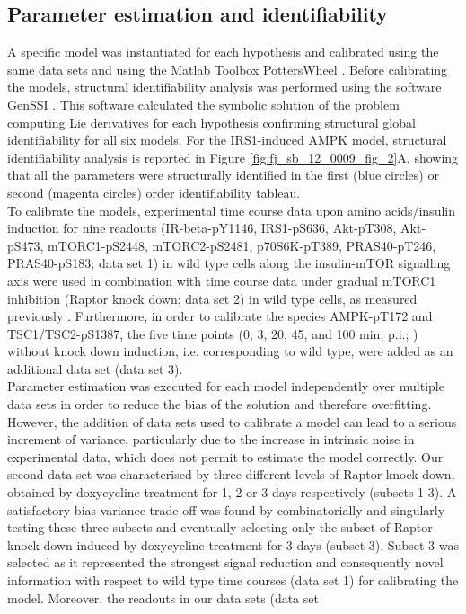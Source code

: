 \subsection{Parameter estimation and identifiability}
\label{paper2-subsec:Parameter estimation and identifiability}
A specific model was instantiated for each hypothesis and calibrated using the same data sets and using the Matlab Toolbox PottersWheel \citep{Maiwald2008}. Before calibrating the models, structural identifiability analysis was performed using the software GenSSI \citep{Chis2011}. This software calculated the symbolic solution of the problem computing Lie derivatives for each hypothesis confirming structural global identifiability for all six models.  For the IRS1-induced AMPK model, structural identifiability analysis is reported in Figure \ref{fig:fj_sb_12_0009_fig_2}A, showing that all the parameters were structurally identified in the first (blue circles) or second (magenta circles) order identifiability tableau.\\
To calibrate the models, experimental time course data upon amino acids/insulin induction for nine readouts (IR-beta-pY1146, IRS1-pS636, Akt-pT308, Akt-pS473, mTORC1-pS2448, mTORC2-pS2481, p70S6K-pT389, PRAS40-pT246, PRAS40-pS183; data set 1) in wild type cells along the insulin-mTOR signalling axis were used in combination with time course data under gradual mTORC1 inhibition (Raptor knock down; data set 2) in wild type cells, as measured previously \citep{DallePezze2012a}. Furthermore, in order to calibrate the species AMPK-pT172 and TSC1/TSC2-pS1387, the five  time points (0, 3, 20, 45, and 100 min. p.i.; \citep[Fig. 1A]{Sonntag2012}) without knock down induction, i.e. corresponding to wild type, were added as an additional data set (data set 3). \\
Parameter estimation was executed for each model independently over multiple data sets in order to reduce the bias of the solution and therefore overfitting. However, the addition of data sets used to calibrate a model can lead to a serious increment of variance, particularly due to the increase in intrinsic noise in experimental data, which does not permit to estimate the model correctly. Our second data set was characterised by three different levels of Raptor knock down, obtained by doxycycline treatment for 1, 2 or 3 days respectively (subsets 1-3). A satisfactory bias-variance trade off was found by combinatorially and singularly testing these three subsets and eventually selecting only the subset of Raptor knock down induced by doxycycline treatment for 3 days (subset 3). Subset 3 was selected as it represented the strongest signal reduction and consequently novel information with respect to wild type time courses (data set 1) for calibrating the model. Moreover, the readouts in our data sets (data set 
